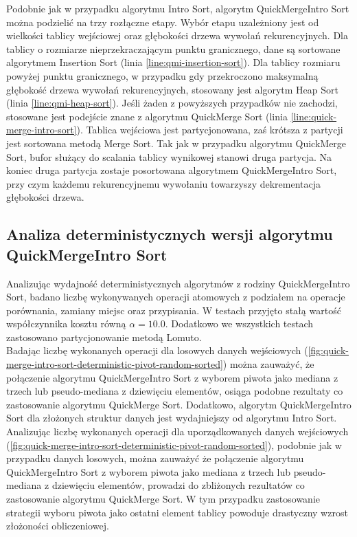Podobnie jak w przypadku algorytmu Intro Sort, algorytm QuickMergeIntro Sort można podzielić na trzy rozłączne etapy. Wybór etapu uzależniony jest od wielkości tablicy wejściowej oraz głębokości drzewa wywołań rekurencyjnych. Dla tablicy o rozmiarze nieprzekraczającym punktu granicznego, dane są sortowane algorytmem Insertion Sort (linia \ref{line:qmi-insertion-sort}). Dla tablicy rozmiaru powyżej punktu granicznego, w przypadku gdy przekroczono maksymalną głębokość drzewa wywołań rekurencyjnych, stosowany jest algorytm Heap Sort (linia \ref{line:qmi-heap-sort}). Jeśli żaden z powyższych przypadków nie zachodzi, stosowane jest podejście znane z algorytmu QuickMerge Sort (linia \ref{line:quick-merge-intro-sort}). Tablica wejściowa jest partycjonowana, zaś krótsza z partycji jest sortowana metodą Merge Sort. Tak jak w przypadku algorytmu QuickMerge Sort, bufor służący do scalania tablicy wynikowej stanowi druga partycja. Na koniec druga partycja zostaje posortowana algorytmem QuickMergeIntro Sort, przy czym każdemu rekurencyjnemu wywołaniu towarzyszy dekrementacja głębokości drzewa.\\



\subsection{Analiza deterministycznych wersji algorytmu QuickMergeIntro Sort}
Analizując wydajność deterministycznych algorytmów z rodziny QuickMergeIntro Sort, badano liczbę wykonywanych operacji atomowych z podziałem na operacje porównania, zamiany miejsc oraz przypisania. W testach przyjęto stałą wartość współczynnika kosztu równą $\alpha = 10.0$. Dodatkowo we wszystkich testach zastosowano partycjonowanie metodą Lomuto.\\

Badając liczbę wykonanych operacji dla losowych danych wejściowych (\ref{fig:quick-merge-intro-sort-deterministic-pivot-random-sorted}) można zauważyć, że połączenie algorytmu QuickMergeIntro Sort z wyborem piwota jako mediana z trzech lub pseudo-mediana z dziewięciu elementów, osiąga podobne rezultaty co zastosowanie algorytmu QuickMerge Sort. Dodatkowo, algorytm QuickMergeIntro Sort dla złożonych struktur danych jest wydajniejszy od algorytmu Intro Sort.\\

Analizując liczbę wykonanych operacji dla uporządkowanych danych wejściowych (\ref{fig:quick-merge-intro-sort-deterministic-pivot-random-sorted}), podobnie jak w przypadku danych losowych, można zauważyć że połączenie algorytmu QuickMergeIntro Sort z wyborem piwota jako mediana z trzech lub pseudo-mediana z dziewięciu elementów, prowadzi do zbliżonych rezultatów co zastosowanie algorytmu QuickMerge Sort. W tym przypadku zastosowanie strategii wyboru piwota jako ostatni element tablicy powoduje drastyczny wzrost złożoności obliczeniowej.\\


